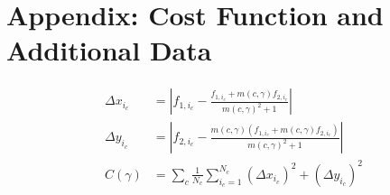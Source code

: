 \documentclass[superscriptaddress, twocolumn, prl]{revtex4}
\begin{document}
\appendix
\section{\label{App:add_data}Appendix: Cost Function and Additional Data}
\begin{align*}
\label{eq:cost}
\Delta x_{i_{c}} &= \left\vert f_{1,i_{c}}-\frac{f_{1,i_{c}}+m\left(c,\gamma\right)f_{2,i_{c}}}{m\left(c,\gamma\right)^{2}+1}\right\vert
\\ \Delta y_{i_c} &= \left\vert f_{2,i_{c}}-\frac{m\left(c,\gamma\right)\left(f_{1,i_{c}}+m\left(c,\gamma\right)f_{2,i_{c}}\right)}{m\left(c,\gamma\right)^{2}+1}  \right\vert
\\ C\left(\gamma\right) &= \sum_{c}\frac{1}{N_{c}}\sum_{i_c=1}^{N_{c}}\left(\Delta x_{i_c}\right)^{2}+\left(\Delta y_{i_c}\right)^{2}
\end{align*}
\end{document}
